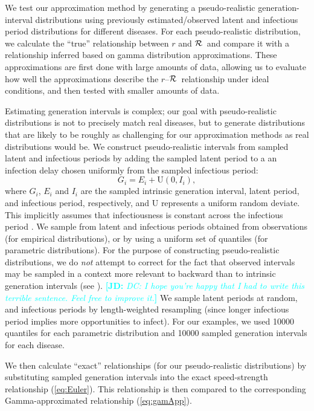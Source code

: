 \documentclass[12pt]{article}
\newcommand{\rR}{\mbox{$r$--$\cal R$}}
\newcommand{\RR}{\ensuremath{{\cal R}}}
\newcommand{\eref}[1]{(\ref{eq:#1})}
\newcommand{\comment}[3]{\textcolor{#1}{\textbf{[#2: }\textit{#3}\textbf{]}}}
\newcommand{\jd}[1]{\comment{cyan}{JD}{#1}}
\begin{document}
We test our approximation method by generating a pseudo-realistic generation-interval distributions using previously estimated/observed latent and infectious period distributions for different diseases.
For each pseudo-realistic distribution, we calculate the ``true'' relationship between $r$ and \RR\ and compare it with a relationship inferred based on gamma distribution approximations. 
These approximations are first done with large amounts of data, allowing us to evaluate how well the approximations describe the \rR\ relationship under ideal conditions, and then tested with smaller amounts of data. 

Estimating generation intervals is complex; our goal with pseudo-realistic distributions is not to precisely match real diseases, but to generate distributions that are likely to be roughly as challenging for our approximation methods as real distributions would be.
We construct pseudo-realistic intervals from sampled latent and infectious periods by adding the sampled latent period to a an infection delay chosen uniformly from the sampled infectious period:
\begin{equation}
	G_i = E_i + \mathrm{U}(0, I_i),
\end{equation}
where $G_i$, $E_i$ and $I_i$ are the sampled intrinsic generation interval, latent period, and infectious period, respectively, and $\mathrm{U}$ represents a uniform random deviate.
This implicitly assumes that infectiousness is constant across the infectious period \cite{HampDush09}.
We sample from latent and infectious periods obtained from observations (for empirical distributions), or by using a uniform set of quantiles (for parametric distributions).
For the purpose of constructing pseudo-realistic distributions, we do \emph{not} attempt to correct for the fact that observed intervals may be sampled in a context more relevant to backward than to intrinsic generation intervals (see \cite{ChamDush15}).
\jd{DC: I hope you're happy that I had to write this terrible sentence. Feel free to improve it.}
We sample latent periods at random, and infectious periods by length-weighted resampling (since longer infectious period implies more opportunities to infect).  
For our examples, we used 10000 quantiles for each parametric distribution and 10000 sampled generation intervals for each disease.

We then calculate ``exact'' relationships (for our pseudo-realistic distributions) by substituting sampled generation intervals into the exact speed-strength relationship \eref{Euler}.
This relationship is then compared to the corresponding Gamma-approximated relationship \eref{gamApp}.
\end{document}
